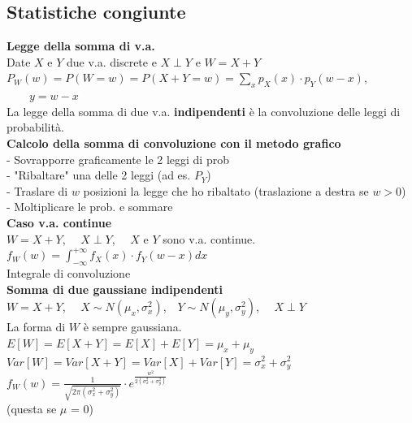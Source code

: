 \documentclass{article}
\begin{document}
\begin{multicols*}{3}
		\section{Statistiche congiunte}
		\textbf{Legge della somma di v.a.}\\
		Date \(X\) e \(Y\) due v.a. discrete e \(X \perp Y\) e \(W = X+Y\)\\
		\(P_W(w) = P(W=w) = P(X+Y = w) = \sum_x p_X (x) \cdot p_Y (w-x)\), \(\qquad y=w-x\)\\
		La legge della somma di due v.a. \textbf{indipendenti} è la convoluzione delle leggi di probabilità.\\
		\textbf{Calcolo della somma di convoluzione con il metodo grafico}\\
		- Sovrapporre graficamente le 2 leggi di prob\\
		- "Ribaltare" una delle 2 leggi (ad es. \(P_Y\))\\
		- Traslare di \(w\) posizioni la legge che ho ribaltato (traslazione a destra se \(w > 0\))\\
		- Moltiplicare le prob. e sommare\\
		\textbf{Caso v.a. continue}\\
		\(W=X+Y\), \(\quad X\perp Y\), \(\quad X\) e \(Y\) sono v.a. continue.\\
		\(f_W(w) = \int_{-\infty}^{+ \infty} f_X (x) \cdot f_Y(w-x) dx \)\\
		Integrale di convoluzione\\
		\textbf{Somma di due gaussiane indipendenti}\\
		\(W=X+Y \), \(\quad X \sim N(\mu_x,\sigma^2_x)\),\(\quad Y \sim N(\mu_y,\sigma^2_y)\), \(\quad X\perp Y\)\\
		La forma di \(W\) è sempre gaussiana.\\
		\(E[W] =E[X+Y]= E[X] + E[Y]= \mu_x + \mu_y\)\\
		\(Var[W]= Var[X+Y] = Var[X]+Var[Y]= \sigma^2_x +\sigma^2_y\)\\
		\(f_W(w)= \frac{1}{\sqrt{2\pi (\sigma^2_x +\sigma^2_y)}}\cdot e^{\frac{w^2}{2(\sigma^2_x +\sigma^2_y)}}\)\\ (questa se \(\mu\) = 0)\\

\end{multicols*}
\end{document}
